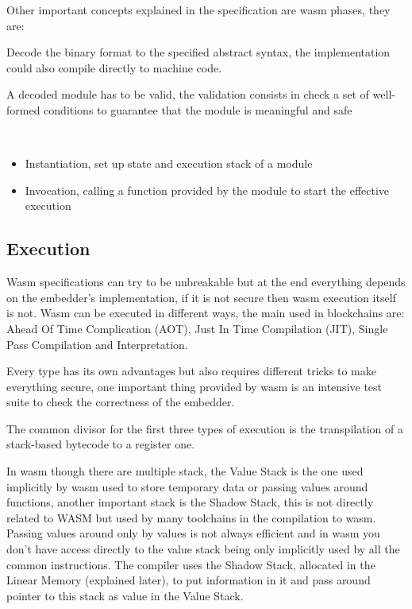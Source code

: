 \documentclass[../main.tex]{subfiles}
\begin{document}
Other important concepts explained in the specification are wasm phases, they are:

\begin{description}[font=$\bullet$ \scshape\bfseries]
  \item[Decoding]
        Decode the binary format to the specified abstract syntax, the implementation could also compile directly to machine code.
  \item[Validation]
        A decoded module has to be valid, the validation consists in check a set of well-formed conditions to guarantee that the module is meaningful and safe ~\cite{wasm-polkadot-wiki}
  \item[Execution]

        \

        \begin{itemize}
          \item Instantiation, set up state and execution stack of a module
          \item Invocation, calling a function provided by the module to start the effective execution
        \end{itemize}
\end{description}

\subsection{Execution}

Wasm specifications can try to be unbreakable but at the end everything depends on the embedder's implementation, if it is not secure then wasm execution itself is not. Wasm can be executed in different ways, the main used in blockchains are: Ahead Of Time Complication (AOT), Just In Time Compilation (JIT), Single Pass Compilation and Interpretation.

Every type has its own advantages but also requires different tricks to make everything secure, one important thing provided by wasm is an intensive test suite to check the correctness of the embedder. ~\cite{wasm-testsuite}

The common divisor for the first three types of execution is the transpilation of a stack-based bytecode to a register one.

In wasm though there are multiple stack, the Value Stack is the one used implicitly by wasm used to store temporary data or passing values around functions, another important stack is the Shadow Stack, this is not directly related to WASM but used by many toolchains in the compilation to wasm. Passing values around only by values is not always efficient and in wasm you don't have access directly to the value stack being only implicitly used by all the common instructions. The compiler uses the Shadow Stack, allocated in the Linear Memory (explained later), to put information in it and pass around pointer to this stack as value in the Value Stack.
\end{document}
